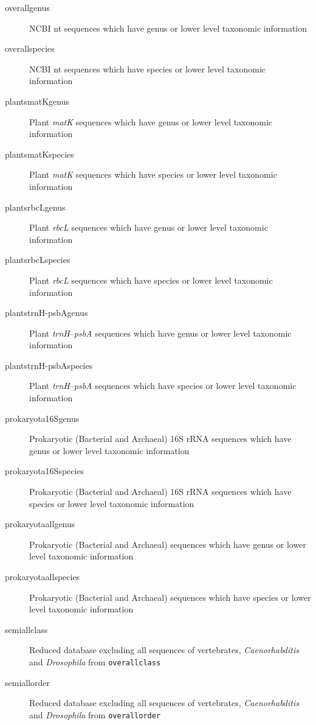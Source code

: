 \documentclass[titlepage,10pt,a4paper,english]{jsbook}
\begin{document}
\begin{description}
\item[overall{\textunderscore}genus] NCBI nt sequences which have genus or lower level taxonomic information
\item[overall{\textunderscore}species] NCBI nt sequences which have species or lower level taxonomic information
\item[plants{\textunderscore}matK{\textunderscore}genus] Plant \textit{matK} sequences which have genus or lower level taxonomic information
\item[plants{\textunderscore}matK{\textunderscore}species] Plant \textit{matK} sequences which have species or lower level taxonomic information
\item[plants{\textunderscore}rbcL{\textunderscore}genus] Plant \textit{rbcL} sequences which have genus or lower level taxonomic information
\item[plants{\textunderscore}rbcL{\textunderscore}species] Plant \textit{rbcL} sequences which have species or lower level taxonomic information
\item[plants{\textunderscore}trnH-psbA{\textunderscore}genus] Plant \textit{trnH}--\textit{psbA} sequences which have genus or lower level taxonomic information
\item[plants{\textunderscore}trnH-psbA{\textunderscore}species] Plant \textit{trnH}--\textit{psbA} sequences which have species or lower level taxonomic information
\item[prokaryota{\textunderscore}16S{\textunderscore}genus] Prokaryotic (Bacterial and Archaeal) 16S rRNA sequences which have genus or lower level taxonomic information
\item[prokaryota{\textunderscore}16S{\textunderscore}species] Prokaryotic (Bacterial and Archaeal) 16S rRNA sequences which have species or lower level taxonomic information
\item[prokaryota{\textunderscore}all{\textunderscore}genus] Prokaryotic (Bacterial and Archaeal) sequences which have genus or lower level taxonomic information
\item[prokaryota{\textunderscore}all{\textunderscore}species] Prokaryotic (Bacterial and Archaeal) sequences which have species or lower level taxonomic information
\item[semiall{\textunderscore}class] Reduced database excluding all sequences of vertebrates, \textit{Caenorhabditis} and \textit{Drosophila} from \texttt{overall{\textunderscore}class}
\item[semiall{\textunderscore}order] Reduced database excluding all sequences of vertebrates, \textit{Caenorhabditis} and \textit{Drosophila} from \texttt{overall{\textunderscore}order}

\end{description}
\end{document}
